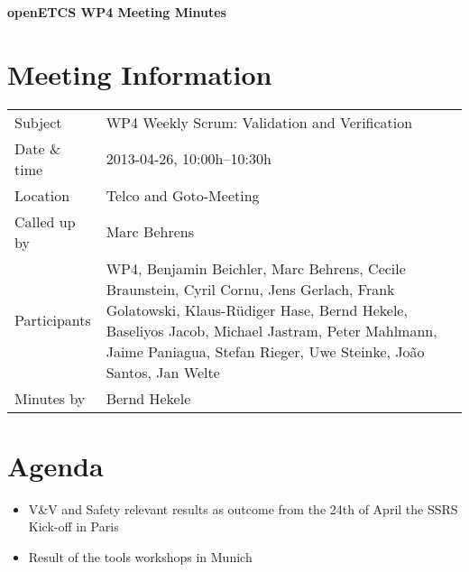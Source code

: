 \documentclass[a4paper, 11pt]{article}
\begin{document}
{\begin{center}\huge\bf openETCS WP4 Meeting Minutes\end{center}}
\section{Meeting Information}

\renewcommand{\arraystretch}{1.5}
\begin{supertabular}{m{.2\textwidth}m{.8\textwidth}}
Subject & WP4 Weekly Scrum: Validation and Verification\\
Date \& time & 2013-04-26, 10:00h--10:30h\\
Location & Telco and Goto-Meeting\\
Called up by & Marc Behrens\\
Participants & WP4,
Benjamin Beichler,
Marc Behrens,
Cecile Braunstein,
Cyril Cornu, 
Jens Gerlach, 
Frank Golatowski, 
Klaus-R\"udiger Hase,
Bernd Hekele,
Baseliyos Jacob,
Michael Jastram, 
Peter Mahlmann, 
Jaime Paniagua,
Stefan Rieger,
Uwe Steinke,
Jo\~ao Santos,
Jan Welte\\

Minutes by & Bernd Hekele\\

\end{supertabular}
\renewcommand{\arraystretch}{1.0}


\section{{Agenda}}
\begin{itemize}
\item V\&V and Safety relevant results as outcome from the 24th of April the SSRS Kick-off in Paris
\item Result of the tools workshops in Munich
\end{itemize}
\end{document}
